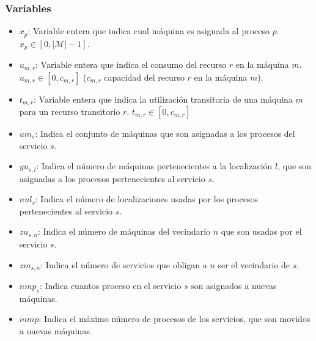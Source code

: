 \subsubsection{Variables}
\begin{itemize}
	\item $x_p$: Variable entera que indica cual máquina es asignada al proceso $p$. $x_p \in [0,|\mathcal{M}|-1]$.
	\item $u_{m,r}$: Variable entera que indica el consumo del recurso $r$ en la máquina $m$. $u_{m,r} \in [0,c_{m,r}]$ ($c_{m,r}$ capacidad del recurso $r$ en la máquina $m$).
	\item $t_{m,r}$: Variable entera que indica la utilización transitoria de una máquina $m$ para un recurso transitorio $r$. $t_{m,r} \in [0,c_{m,r}]$
	\item $um_s$: Indica el conjunto de máquinas que son asignadas a los procesos del servicio $s$.
	\item $yu_{s,l}$: Indica el número de máquinas pertenecientes a la localización $l$, que son asignadas a los procesos pertenecientes al servicio $s$.
	\item $nul_s$: Indica el número de localizaciones usadas por los procesos pertenecientes al servicio $s$.
	\item $zu_{s,n}$: Indica el número de máquinas del vecindario $n$ que son usadas por el servicio $s$.
	\item $zm_{s,n}$: Indica el número de servicios que obligan a $n$ ser el vecindario de $s$.
	\item $nmp_s$: Indica cuantos proceso en el servicio $s$ son asignados a nuevas máquinas.
	\item $mmp$: Indica el máximo número de procesos de los servicios, que son movidos a nuevas máquinas.
\end{itemize}

